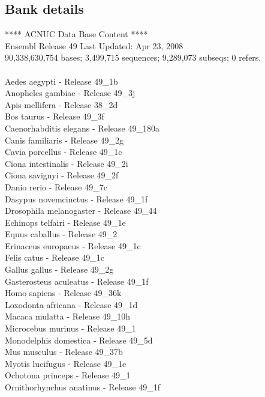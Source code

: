 \documentclass{article}
\begin{document}
\begin{Schunk}
\subsection{Bank details}
             ****     ACNUC Data Base Content      ****\\
             Ensembl Release 49	     		 Last Updated: Apr 23, 2008\\
90,338,630,754 bases; 3,499,715 sequences; 9,289,073 subseqs; 0 refers.\\
\\
 Aedes aegypti - Release 49\_1b \\
 Anopheles gambiae - Release 49\_3j \\
 Apis mellifera - Release 38\_2d \\
 Bos taurus - Release 49\_3f \\
 Caenorhabditis elegans - Release 49\_180a \\
 Canis familiaris - Release 49\_2g \\
 Cavia porcellus - Release 49\_1c \\
 Ciona intestinalis - Release 49\_2i \\
 Ciona savignyi - Release 49\_2f \\
 Danio rerio - Release 49\_7c \\
 Dasypus novemcinctus - Release 49\_1f \\
 Drosophila melanogaster - Release 49\_44 \\
 Echinops telfairi - Release 49\_1e \\
 Equus caballus - Release 49\_2 \\
 Erinaceus europaeus - Release 49\_1c \\
 Felis catus - Release 49\_1c \\
 Gallus gallus - Release 49\_2g \\
 Gasterosteus aculeatus - Release 49\_1f \\
 Homo sapiens - Release 49\_36k \\
 Loxodonta africana - Release 49\_1d \\
 Macaca mulatta - Release 49\_10h \\
 Microcebus murinus - Release 49\_1 \\
 Monodelphis domestica - Release 49\_5d \\
 Mus musculus - Release 49\_37b \\
 Myotis lucifugus - Release 49\_1e \\
 Ochotona princeps - Release 49\_1 \\
 Ornithorhynchus anatinus - Release 49\_1f \\

\end{Schunk}
\end{document}
